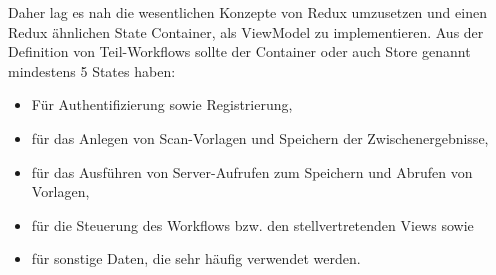 \documentclass[notables, nomenclature, oneside, 150]{HSMW-Thesis}
\begin{document}
		Daher lag es nah die wesentlichen Konzepte von Redux umzusetzen und einen Redux ähnlichen State Container, als ViewModel zu implementieren. Aus der Definition von Teil-Workflows sollte der Container oder auch Store genannt mindestens 5 States haben: 
		\vspace{-5mm}
		\begin{itemize}
			\item Für Authentifizierung sowie Registrierung,
			\item für das Anlegen von Scan-Vorlagen und Speichern der Zwischenergebnisse,
			\item für das Ausführen von Server-Aufrufen zum Speichern und Abrufen von Vorlagen, 
			\item für die Steuerung des Workflows bzw. den stellvertretenden Views sowie
			\item für sonstige Daten, die sehr häufig verwendet werden.
		\end{itemize}
		
\end{document}

